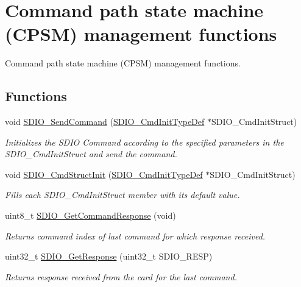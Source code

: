 \hypertarget{group___s_d_i_o___group2}{\section{Command path state machine (C\-P\-S\-M) management functions}
\label{group___s_d_i_o___group2}
}


Command path state machine (C\-P\-S\-M) management functions.  


\subsection*{Functions}
\begin{DoxyCompactItemize}
\item 
void \hyperlink{group___s_d_i_o___group2_ga7117d2f702703f6c0a66bc07707cab23}{S\-D\-I\-O\-\_\-\-Send\-Command} (\hyperlink{struct_s_d_i_o___cmd_init_type_def}{S\-D\-I\-O\-\_\-\-Cmd\-Init\-Type\-Def} $\ast$S\-D\-I\-O\-\_\-\-Cmd\-Init\-Struct)
\begin{DoxyCompactList}\small\item\em Initializes the S\-D\-I\-O Command according to the specified parameters in the S\-D\-I\-O\-\_\-\-Cmd\-Init\-Struct and send the command. \end{DoxyCompactList}\item 
void \hyperlink{group___s_d_i_o___group2_ga09d9e89f49c87c82aec79c97b7068e24}{S\-D\-I\-O\-\_\-\-Cmd\-Struct\-Init} (\hyperlink{struct_s_d_i_o___cmd_init_type_def}{S\-D\-I\-O\-\_\-\-Cmd\-Init\-Type\-Def} $\ast$S\-D\-I\-O\-\_\-\-Cmd\-Init\-Struct)
\begin{DoxyCompactList}\small\item\em Fills each S\-D\-I\-O\-\_\-\-Cmd\-Init\-Struct member with its default value. \end{DoxyCompactList}\item 
uint8\-\_\-t \hyperlink{group___s_d_i_o___group2_ga9badf271c818e09da301d715c4ad0e5b}{S\-D\-I\-O\-\_\-\-Get\-Command\-Response} (void)
\begin{DoxyCompactList}\small\item\em Returns command index of last command for which response received. \end{DoxyCompactList}\item 
uint32\-\_\-t \hyperlink{group___s_d_i_o___group2_ga5c1e859511840e8cca6a9a768bce220b}{S\-D\-I\-O\-\_\-\-Get\-Response} (uint32\-\_\-t S\-D\-I\-O\-\_\-\-R\-E\-S\-P)
\begin{DoxyCompactList}\small\item\em Returns response received from the card for the last command. \end{DoxyCompactList}\end{DoxyCompactItemize}



